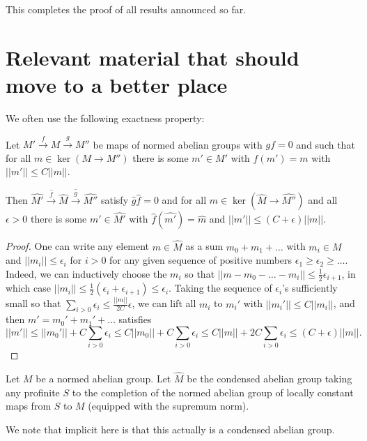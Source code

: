 This completes the proof of all results announced so far.



\section{Relevant material that should move to a better place}

We often use the following exactness property:

\begin{proposition}\label{prop:completeexact} Let $M'\xrightarrow{f} M\xrightarrow{g} M''$ be maps of normed abelian groups with $gf=0$ and such that for all $m\in \ker(M\to M'')$ there is some $m'\in M'$ with $f(m')=m$ with $||m'||\leq C||m||$.

Then $\widehat{M'}\xrightarrow{\widehat{f}} \widehat{M}\xrightarrow{\widehat{g}} \widehat{M''}$ satisfy $\widehat{g}\widehat{f}=0$ and for all $m\in \ker(\widehat{M}\to \widehat{M''})$ and all $\epsilon>0$ there is some $m'\in \widehat{M'}$ with $\widehat{f}(\widehat{m'})=\widehat{m}$ and $||m'||\leq (C+\epsilon)||m||$.
\end{proposition}

\begin{proof} One can write any element $m\in \widehat{M}$ as a sum $m_0+m_1+\ldots$ with $m_i\in M$ and $||m_i||\leq \epsilon_i$ for $i>0$ for any given sequence of positive numbers $\epsilon_1\geq \epsilon_2\geq \ldots$. Indeed, we can inductively choose the $m_i$ so that $||m-m_0-\ldots-m_i||\leq \tfrac 12 \epsilon_{i+1}$, in which case $||m_i||\leq \tfrac 12(\epsilon_i+\epsilon_{i+1})\leq \epsilon_i$. Taking the sequence of $\epsilon_i$'s sufficiently small so that $\sum_{i>0} \epsilon_i\leq \tfrac {||m||}{2C} \epsilon$, we can lift all $m_i$ to $m_i'$ with $||m_i'||\leq C||m_i||$, and then $m'=m_0'+m_1'+\ldots$ satisfies
\[
||m'||\leq ||m_0'||+C\sum_{i>0} \epsilon_i\leq C||m_0||+C\sum_{i>0} \epsilon_i\leq C||m||+2C\sum_{i>0} \epsilon_i\leq (C+\epsilon)||m||.
\]
\end{proof}

\begin{definition} Let $M$ be a normed abelian group. Let $\widehat{M}$ be the condensed abelian group taking any profinite $S$ to the completion of the normed abelian group of locally constant maps from $S$ to $M$ (equipped with the supremum norm).
\end{definition}

We note that implicit here is that this actually is a condensed abelian group.

